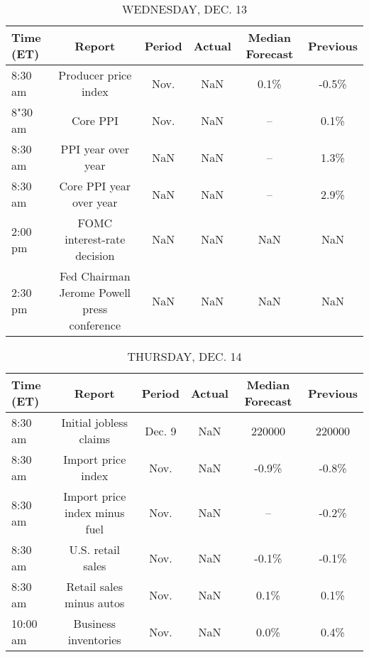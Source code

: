 \documentclass{article}%
\begin{document}
\begin{table}[htbp]%
\caption{WEDNESDAY, DEC. 13}%
\centering%
\begin{adjustbox}{width=1\textwidth}%
\begin{tabular}{lccccc}
\toprule
Time (ET) &                                      Report & Period & Actual & Median Forecast & Previous \\
\midrule
  8:30 am &                        Producer price index &   Nov. &    NaN &            0.1\% &    -0.5\% \\
  8"30 am &                                    Core PPI &   Nov. &    NaN &              -- &     0.1\% \\
  8:30 am &                          PPI year over year &    NaN &    NaN &              -- &     1.3\% \\
  8:30 am &                     Core PPI year over year &    NaN &    NaN &              -- &     2.9\% \\
  2:00 pm &                 FOMC interest-rate decision &    NaN &    NaN &             NaN &      NaN \\
  2:30 pm & Fed Chairman Jerome Powell press conference &    NaN &    NaN &             NaN &      NaN \\
\bottomrule
\end{tabular}
%
\end{adjustbox}%
\end{table}

%


\begin{table}[htbp]%
\caption{THURSDAY, DEC. 14}%
\centering%
\begin{adjustbox}{width=1\textwidth}%
\begin{tabular}{lccccc}
\toprule
Time (ET) &                        Report & Period & Actual & Median Forecast & Previous \\
\midrule
  8:30 am &        Initial jobless claims & Dec. 9 &    NaN &          220000 &   220000 \\
  8:30 am &            Import price index &   Nov. &    NaN &           -0.9\% &    -0.8\% \\
  8:30 am & Import price index minus fuel &   Nov. &    NaN &              -- &    -0.2\% \\
  8:30 am &             U.S. retail sales &   Nov. &    NaN &           -0.1\% &    -0.1\% \\
  8:30 am &      Retail sales minus autos &   Nov. &    NaN &            0.1\% &     0.1\% \\
 10:00 am &          Business inventories &   Nov. &    NaN &            0.0\% &     0.4\% \\
\bottomrule
\end{tabular}
%
\end{adjustbox}%
\end{table}
\end{document}
